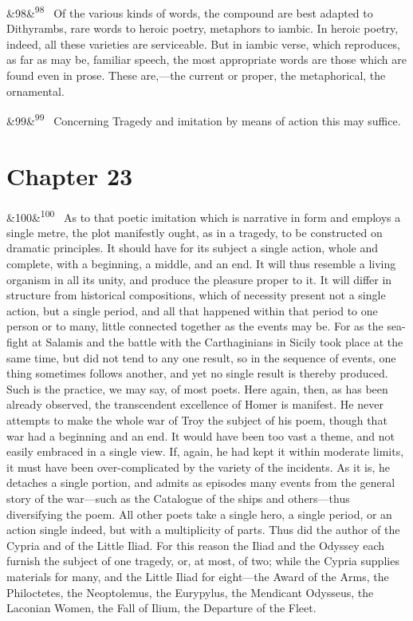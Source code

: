 \documentclass[12pt]{article}
\newcommand{\para}[1][]{\par\noindent\ifx&#1&\else\textsuperscript{\footnotesize #1}~\fi}
\begin{document}
{\para[98] Of the various kinds of words, the compound are best adapted to Dithyrambs, rare words to heroic poetry, metaphors to iambic. In heroic poetry, indeed, all these varieties are serviceable. But in iambic verse, which reproduces, as far as may be, familiar speech, the most appropriate words are those which are found even in prose. These are,---the current or proper, the metaphorical, the ornamental.

\para[99] Concerning Tragedy and imitation by means of action this may suffice.

\section*{Chapter 23}

\para[100] As to that poetic imitation which is narrative in form and employs a single metre, the plot manifestly ought, as in a tragedy, to be constructed on dramatic principles. It should have for its subject a single action, whole and complete, with a beginning, a middle, and an end. It will thus resemble a living organism in all its unity, and produce the pleasure proper to it. It will differ in structure from historical compositions, which of necessity present not a single action, but a single period, and all that happened within that period to one person or to many, little connected together as the events may be. For as the sea-fight at Salamis and the battle with the Carthaginians in Sicily took place at the same time, but did not tend to any one result, so in the sequence of events, one thing sometimes follows another, and yet no single result is thereby produced. Such is the practice, we may say, of most poets. Here again, then, as has been already observed, the transcendent excellence of Homer is manifest. He never attempts to make the whole war of Troy the subject of his poem, though that war had a beginning and an end. It would have been too vast a theme, and not easily embraced in a single view. If, again, he had kept it within moderate limits, it must have been over-complicated by the variety of the incidents. As it is, he detaches a single portion, and admits as episodes many events from the general story of the war---such as the Catalogue of the ships and others---thus diversifying the poem. All other poets take a single hero, a single period, or an action single indeed, but with a multiplicity of parts. Thus did the author of the Cypria and of the Little Iliad. For this reason the Iliad and the Odyssey each furnish the subject of one tragedy, or, at most, of two; while the Cypria supplies materials for many, and the Little Iliad for eight---the Award of the Arms, the Philoctetes, the Neoptolemus, the Eurypylus, the Mendicant Odysseus, the Laconian Women, the Fall of Ilium, the Departure of the Fleet.

}
\end{document}
